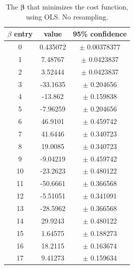 \documentclass[reprint,english,notitlepage]{revtex4-1}  %
\newcommand{\vect}[1]{\boldsymbol{#1}}
\begin{document}
\begin{table}[h]  %
\caption{The $\vect{\beta}$ that minimizes the cost function, using OLS. No resampling.}\label{table}
\begin{tabular}{|c|c|c|} %
\hline                    %
$\beta$ entry & value & 95\% confidence  \\
\hline
0 & 0.435072 & $\pm$ 0.00378377\\                                                                                        1 &  7.48767 & $\pm$  0.0423837\\                                                                                          2 &  3.52444 & $\pm$ 0.0423837\\                                                                                          3 & -33.1635 & $\pm$  0.204656\\                                                                                          4 &  -13.862 & $\pm$  0.159838\\                                                                                5 & -7.96259 & $\pm$  0.204656\\                                                                                          6 &  46.9101 & $\pm$ 0.459742\\                              7 &  41.6446 & $\pm$  0.340723\\                                                                                          8 &  19.0085 & $\pm$  0.340723\\                                                                                          9 & -9.04219 & $\pm$  0.459742\\                                                                                         10 & -23.2623 & $\pm$   0.480122\\                                                                                         11 & -50.6661 & $\pm$  0.366568\\                                                                                         12 & -5.51051 & $\pm$  0.341091\\                                                                                         13 & -28.5962 & $\pm$  0.366568\\                                                                                         14 &  29.9243 & $\pm$  0.480122\\                                                                                         15 &  1.64575 & $\pm$  0.188273\\                                                                                         16 &  18.2115 & $\pm$  0.163674\\                                                                                         17 &  9.41273 & $\pm$  0.159634\\                                                             
\end{tabular}
\end{table}
\end{document}
